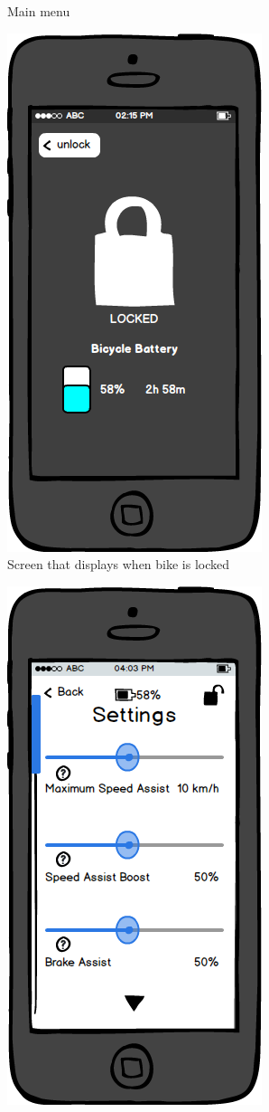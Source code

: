 \documentclass[a4paper]{report}
\begin{document}
{\begin{figure}
\caption{Main menu}
\end{figure}
\clearpage
\begin{figure}
\centering
\includegraphics[scale=0.9]{figures/prototype_1/locked}
\caption{Screen that displays when bike is locked}
\end{figure}
\clearpage
\begin{figure}
\centering
\includegraphics[scale=0.9]{figures/prototype_1/settings}

\end{figure}}
\end{document}
